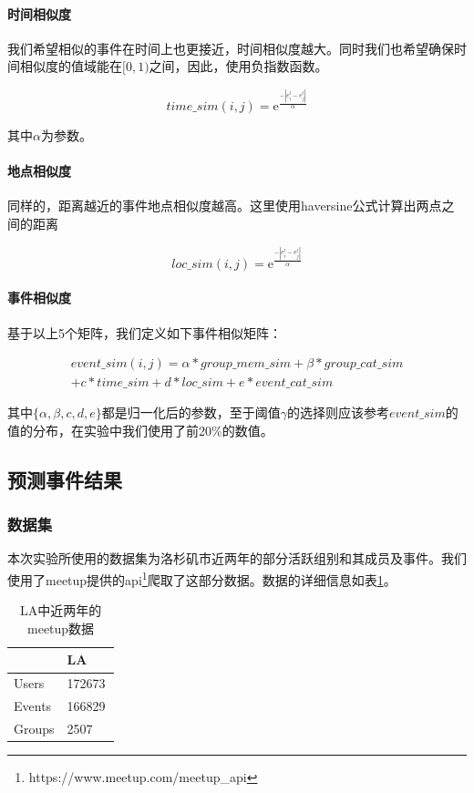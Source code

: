 \documentclass[12pt]{template}
\begin{document}
\paragraph{时间相似度}

我们希望相似的事件在时间上也更接近，时间相似度越大。同时我们也希望确保时间相似度的值域能在\([0,1)\)之间，因此，使用负指数函数。

\begin{equation}   
time\_sim(i,j)=\mathrm{e}^\frac{-|e_i^t-e_j^t|}{\alpha}
\end{equation}

其中\(\alpha\)为参数。

\paragraph{地点相似度}

同样的，距离越近的事件地点相似度越高。这里使用haversine公式计算出两点之间的距离

\begin{equation}   
loc\_sim(i,j)=\mathrm{e}^\frac{-|e_i^l-e_j^l|}{\alpha}
\end{equation}

\paragraph{事件相似度}
基于以上5个矩阵，我们定义如下事件相似矩阵：

\begin{multline}   
event\_sim(i,j)=\alpha*group\_mem\_sim+\beta*group\_cat\_sim
\\+{c}*time\_sim+{d}*loc\_sim+{e}*event\_cat\_sim
\end{multline}

其中\(\{\alpha,\beta,{c},{d},{e}\}\)都是归一化后的参数，至于阈值\(\gamma\)的选择则应该参考\(event\_sim\)的值的分布，在实验中我们使用了前20\%的数值。

\subsection{预测事件结果}
\subsubsection{数据集}
本次实验所使用的数据集为洛杉矶市近两年的部分活跃组别和其成员及事件。我们使用了meetup提供的api\footnote{https://www.meetup.com/meetup\_api}爬取了这部分数据。数据的详细信息如表\ref{t1-1}。
\begin{table}[htbp] 
  \centering  
  \caption{\label{t1-1}LA中近两年的meetup数据}
    \begin{tabular*}{\linewidth}{p{0.5\linewidth}p{0.5\linewidth}}
\toprule
    & LA \\
\midrule
    Users & 172673\\
    Events & 166829\\
    Groups & 2507\\
\bottomrule
    \end{tabular*}
\end{table}
\end{document}
